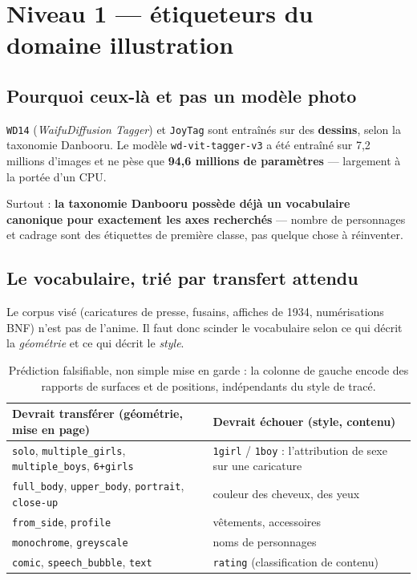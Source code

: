 \documentclass[11pt,a4paper]{article}
\newcommand{\alerte}[1]{\textcolor{alerte}{\textbf{#1}}}
\newcommand{\bon}[1]{\textcolor{vert}{\textbf{#1}}}
\begin{document}
\section{Niveau 1 — étiqueteurs du domaine illustration}

\subsection{Pourquoi ceux-là et pas un modèle photo}

\texttt{WD14} (\emph{WaifuDiffusion Tagger}) et \texttt{JoyTag} sont entraînés
sur des \textbf{dessins}, selon la taxonomie Danbooru. Le modèle
\texttt{wd-vit-tagger-v3} a été entraîné sur 7,2 millions d'images et ne pèse que
\textbf{94,6 millions de paramètres} — largement à la portée d'un CPU.

Surtout : \textbf{la taxonomie Danbooru possède déjà un vocabulaire canonique
pour exactement les axes recherchés} — nombre de personnages et cadrage sont des
étiquettes de première classe, pas quelque chose à réinventer.

\subsection{Le vocabulaire, trié par transfert attendu}

Le corpus visé (caricatures de presse, fusains, affiches de 1934, numérisations
BNF) n'est pas de l'anime. Il faut donc scinder le vocabulaire selon ce qui
décrit la \emph{géométrie} et ce qui décrit le \emph{style}.

\begin{table}[h]
\centering\small
\begin{tabularx}{\textwidth}{YY}
\toprule
\bon{Devrait transférer} (géométrie, mise en page) &
\alerte{Devrait échouer} (style, contenu) \\
\midrule
\texttt{solo}, \texttt{multiple\_girls}, \texttt{multiple\_boys}, \texttt{6+girls}
  & \texttt{1girl} / \texttt{1boy} : l'attribution de sexe sur une caricature \\
\texttt{full\_body}, \texttt{upper\_body}, \texttt{portrait}, \texttt{close-up}
  & couleur des cheveux, des yeux \\
\texttt{from\_side}, \texttt{profile}
  & vêtements, accessoires \\
\texttt{monochrome}, \texttt{greyscale}
  & noms de personnages \\
\texttt{comic}, \texttt{speech\_bubble}, \texttt{text}
  & \texttt{rating} (classification de contenu) \\
\bottomrule
\end{tabularx}
\caption{Prédiction falsifiable, non simple mise en garde : la colonne de gauche
encode des rapports de surfaces et de positions, indépendants du style de tracé.}
\end{table}
\end{document}
